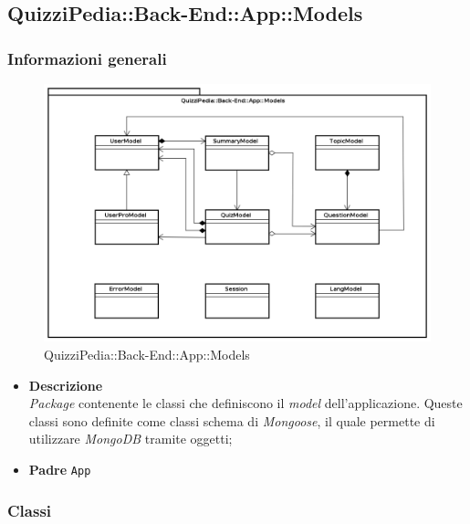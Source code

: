 \subsection{QuizziPedia::Back-End::App::Models}
\subsubsection{Informazioni generali}
\label{QuizziPedia::Back-End::App::Models}
\begin{figure}
	\centering
	\includegraphics[scale=0.45]{UML/Package/QuizziPedia_Back-End_App_Models.png}
	\caption{QuizziPedia::Back-End::App::Models}
\end{figure}
\FloatBarrier
\begin{itemize}
	\item \textbf{Descrizione} \\
	\textit{Package} contenente le classi che definiscono il \textit{model} dell'applicazione. Queste classi sono definite come classi schema di \textit{Mongoose}, il quale permette di utilizzare \textit{MongoDB} tramite oggetti;
	\item \textbf{Padre} \texttt{App}
\end{itemize}

\subsubsection{Classi}









